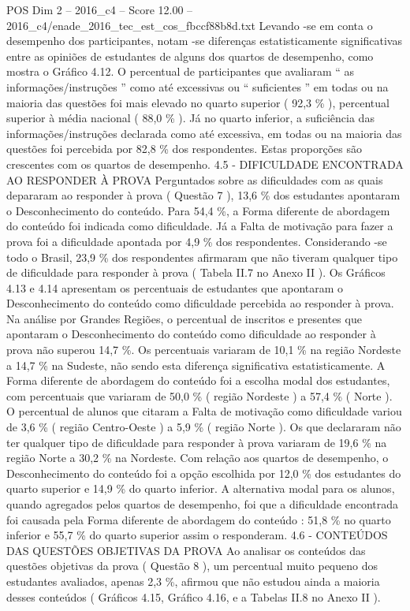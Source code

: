 \begin{textsample}{POS Dim 2 – 2016\_c4 – Score 12.00 – 2016\_c4/enade\_2016\_tec\_est\_cos\_fbccf88b8d.txt}
Levando -se em conta o desempenho dos participantes, notam -se diferenças estatisticamente significativas entre as opiniões de estudantes de alguns dos quartos de desempenho, como mostra o Gráfico 4.12.
O percentual de participantes que avaliaram “ as informações/instruções ” como até excessivas ou “ suficientes ” em todas ou na maioria das questões foi mais elevado no quarto superior ( 92,3 \% ), percentual superior à média nacional ( 88,0 \% ).
Já no quarto inferior, a suficiência das informações/instruções declarada como até excessiva, em todas ou na maioria das questões foi percebida por 82,8 \% dos respondentes.
Estas proporções são crescentes com os quartos de desempenho. 4.5 - DIFICULDADE ENCONTRADA AO RESPONDER À PROVA Perguntados sobre as dificuldades com as quais depararam ao responder à prova ( Questão 7 ), 13,6 \% dos estudantes apontaram o Desconhecimento do conteúdo.
Para 54,4 \%, a Forma diferente de abordagem do conteúdo foi indicada como dificuldade.
Já a Falta de motivação para fazer a prova foi a dificuldade apontada por 4,9 \% dos respondentes.
Considerando -se todo o Brasil, 23,9 \% dos respondentes afirmaram que não tiveram qualquer tipo de dificuldade para responder à prova ( Tabela II.7 no Anexo II ).
Os Gráficos 4.13 e 4.14 apresentam os percentuais de estudantes que apontaram o Desconhecimento do conteúdo como dificuldade percebida ao responder à prova.
Na análise por Grandes Regiões, o percentual de inscritos e presentes que apontaram o Desconhecimento do conteúdo como dificuldade ao responder à prova não superou 14,7 \%.
Os percentuais variaram de 10,1 \% na região Nordeste a 14,7 \% na Sudeste, não sendo esta diferença significativa estatisticamente.
A Forma diferente de abordagem do conteúdo foi a escolha modal dos estudantes, com percentuais que variaram de 50,0 \% ( região Nordeste ) a 57,4 \% ( Norte ).
O percentual de alunos que citaram a Falta de motivação como dificuldade variou de 3,6 \% ( região Centro-Oeste ) a 5,9 \% ( região Norte ).
Os que declararam não ter qualquer tipo de dificuldade para responder à prova variaram de 19,6 \% na região Norte a 30,2 \% na Nordeste.
Com relação aos quartos de desempenho, o Desconhecimento do conteúdo foi a opção escolhida por 12,0 \% dos estudantes do quarto superior e 14,9 \% do quarto inferior.
A alternativa modal para os alunos, quando agregados pelos quartos de desempenho, foi que a dificuldade encontrada foi causada pela Forma diferente de abordagem do conteúdo : 51,8 \% no quarto inferior e 55,7 \% do quarto superior assim o responderam. 4.6 - CONTEÚDOS DAS QUESTÕES OBJETIVAS DA PROVA Ao analisar os conteúdos das questões objetivas da prova ( Questão 8 ), um percentual muito pequeno dos estudantes avaliados, apenas 2,3 \%, afirmou que não estudou ainda a maioria desses conteúdos ( Gráficos 4.15, Gráfico 4.16, e a Tabelas II.8 no Anexo II ).

\end{textsample}
